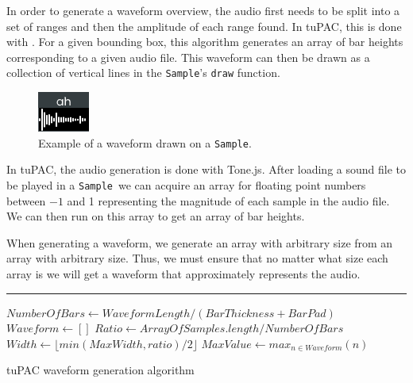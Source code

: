 \documentclass[12pt,a4paper,oneside,openright]{report}
\newcommand{\sample}{\texttt{Sample}}
\begin{document}
In order to generate a waveform overview, the audio first needs to be split into a set of ranges and then the amplitude of each range found. In tuPAC, this is done with . For a given bounding box, this algorithm generates an array of bar heights corresponding to a given audio file. This waveform can then be drawn as a collection of vertical lines in the \sample's \verb|draw| function.

\begin{figure}[h]
    \centering
    \includegraphics[scale=1.5]{images/sample.png}
    \caption{Example of a waveform drawn on a \sample.}
    \label{fig:my_label}
\end{figure}

In tuPAC, the audio generation is done with Tone.js. After loading a sound file to be played in a \sample\ we can acquire an array for floating point numbers between $-1$ and 1 representing the magnitude of each sample in the audio file. We can then run  on this array to get an array of bar heights.

When generating a waveform, we generate an array with arbitrary size from an array with arbitrary size. Thus, we must ensure that no matter what size each array is we will get a waveform that approximately represents the audio.

\begin{algorithm}[H]
\DontPrintSemicolon
{}
\vspace{1mm} \hrule \vspace{1mm}
\nl $NumberOfBars \gets WaveformLength/(BarThickness + BarPad)$\;
\nl $Waveform \gets []$\;
\nl $Ratio \gets ArrayOfSamples.length / NumberOfBars$\;
\nl $Width \gets \lfloor min(MaxWidth, ratio)/2\rfloor$\;
\nl {}
\nl $MaxValue \gets max_{n\in Waveform}(n)$\;
\nl {}
\caption{tuPAC waveform generation algorithm}\label{alg:waveform}
\end{algorithm}
\end{document}
